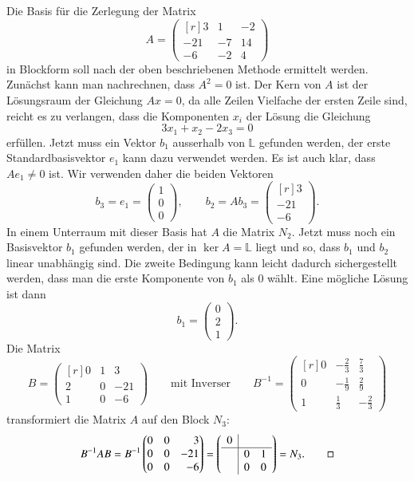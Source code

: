 \begin{beispiel}
Die Basis für die Zerlegung der Matrix
\[
A
=
\begin{pmatrix*}[r]
  3& 1&-2\\
-21&-7&14\\
 -6&-2& 4
\end{pmatrix*}
\]
in Blockform soll nach der oben beschriebenen Methode ermittelt werden.
Zunächst kann man nachrechnen, dass $A^2=0$ ist.
Der Kern von $A$ ist der Lösungsraum der Gleichung $Ax=0$, da alle Zeilen
Vielfache der ersten Zeile sind, reicht es zu verlangen, dass die
Komponenten $x_i$ der Lösung die Gleichung
\[
3x_1+x_2-2x_3=0
\]
erfüllen.
Jetzt muss ein Vektor $b_1$ ausserhalb von $\mathbb{L}$ gefunden werden,
der erste Standardbasisvektor $e_1$ kann dazu verwendet werden.
Es ist auch klar, dass $Ae_1\ne 0$ ist.
Wir verwenden daher die beiden Vektoren 
\[
b_3=e_1=\begin{pmatrix} 1\\0\\0 \end{pmatrix}
,\qquad
b_2=Ab_3=\begin{pmatrix*}[r] 3\\-21\\-6 \end{pmatrix*}.
\]
In einem Unterraum mit
dieser Basis hat $A$ die Matrix $N_2$.
Jetzt muss noch ein Basisvektor $b_1$ gefunden werden,
der in $\ker A=\mathbb{L}$ liegt und so, dass $b_1$ und $b_2$ 
linear unabhängig sind.
Die zweite Bedingung kann leicht dadurch sichergestellt werden,
dass man die erste Komponente von $b_1$ als $0$ wählt.
Eine mögliche Lösung ist dann
\[
b_1=\begin{pmatrix}0\\2\\1\end{pmatrix}.
\]
Die Matrix 
\[
B=\begin{pmatrix*}[r]
 0& 1&   3\\
 2& 0& -21\\
 1& 0&  -6
\end{pmatrix*}
\qquad\text{mit Inverser}
\qquad
B^{-1}=\begin{pmatrix*}[r]
0&-\frac23& \frac73\\
0&-\frac19& \frac29\\
1& \frac13&-\frac23
\end{pmatrix*}
\]
transformiert die Matrix $A$ auf den Block $N_3$:
\[
B^{-1}AB
=
B^{-1}\begin{pmatrix*}[r]
0&0&  3\\
0&0&-21\\
0&0& -6
\end{pmatrix*}
=
\left(
\begin{array}{c|cc}
0& & \\
\hline
 &0&1\\
 &0&0
\end{array}
\right)
=
N_3.
\qedhere
\]
\end{beispiel}

